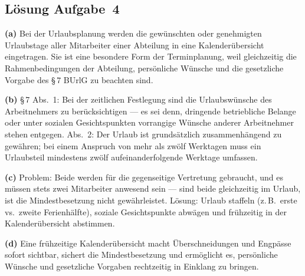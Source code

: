 \documentclass[11pt, a4paper]{article}
\begin{document}
\subsection*{Lösung Aufgabe~4}
\begin{loesung}
\textbf{(a)} Bei der Urlaubsplanung werden die gewünschten oder genehmigten Urlaubstage
aller Mitarbeiter einer Abteilung in eine Kalenderübersicht eingetragen. Sie ist eine
besondere Form der Terminplanung, weil gleichzeitig die Rahmenbedingungen der Abteilung,
persönliche Wünsche und die gesetzliche Vorgabe des §\,7 BUrlG zu beachten sind.

\textbf{(b)} §\,7 Abs.~1: Bei der zeitlichen Festlegung sind die Urlaubswünsche des
Arbeitnehmers zu berücksichtigen --- es sei denn, dringende betriebliche Belange oder
unter sozialen Gesichtspunkten vorrangige Wünsche anderer Arbeitnehmer stehen entgegen.
Abs.~2: Der Urlaub ist grundsätzlich zusammenhängend zu gewähren; bei einem Anspruch von
mehr als zwölf Werktagen muss ein Urlaubsteil mindestens zwölf aufeinanderfolgende
Werktage umfassen.

\textbf{(c)} Problem: Beide werden für die gegenseitige Vertretung gebraucht, und es
müssen stets zwei Mitarbeiter anwesend sein --- sind beide gleichzeitig im Urlaub, ist
die Mindestbesetzung nicht gewährleistet. Lösung: Urlaub staffeln (z.\,B.\ erste vs.\
zweite Ferienhälfte), soziale Gesichtspunkte abwägen und frühzeitig in der
Kalenderübersicht abstimmen.

\textbf{(d)} Eine frühzeitige Kalenderübersicht macht Überschneidungen und
Engpässe sofort sichtbar, sichert die Mindestbesetzung und ermöglicht es, persönliche
Wünsche und gesetzliche Vorgaben rechtzeitig in Einklang zu bringen.
\end{loesung}
\end{document}
